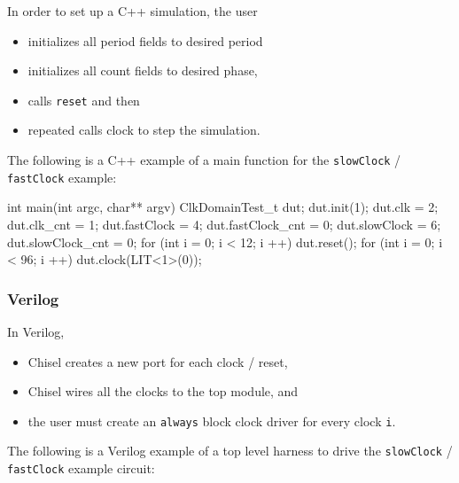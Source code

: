 \documentclass[10pt,twocolumn]{article}
\begin{document}
\noindent
In order to set up a C++ simulation, the user 
\begin{itemize}
\item initializes all period fields to desired period
\item initializes all count fields to desired phase, 
\item calls \verb+reset+ and then
\item repeated calls clock to step the simulation.
\end{itemize}

\noindent
The following is a C++ example of a main function for the \verb+slowClock+ / \verb+fastClock+ example:

\begin{scala}
int main(int argc, char** argv) {
  ClkDomainTest_t dut;
  dut.init(1);
  dut.clk = 2;
  dut.clk_cnt = 1;
  dut.fastClock = 4;
  dut.fastClock_cnt = 0;
  dut.slowClock = 6;
  dut.slowClock_cnt = 0;
  for (int i = 0; i < 12; i ++) 
    dut.reset();
  for (int i = 0; i < 96; i ++) 
    dut.clock(LIT<1>(0));
}
\end{scala}

\subsubsection{Verilog}

In Verilog, 

\begin{itemize}
\item Chisel creates a new port for each clock / reset,
\item Chisel wires all the clocks to the top module, and
\item the user must create an \verb+always+ block clock driver for every clock \verb+i+.
\end{itemize}

\noindent
The following is a Verilog example of a top level harness to drive the  \verb+slowClock+ / \verb+fastClock+ example circuit:

\end{document}
